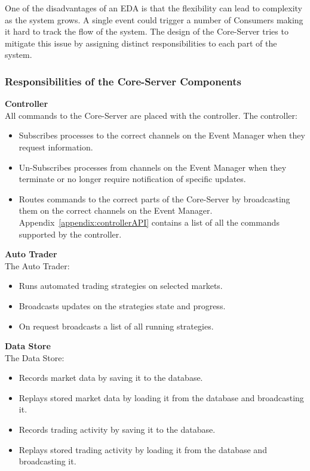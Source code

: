	One of the disadvantages of an EDA is that the flexibility can lead to complexity as the system grows. A single event could trigger a number of Consumers making it hard to track the flow of the system. The design of the Core-Server tries to mitigate this issue by assigning distinct responsibilities to each part of the system.
	
	\subsubsection{Responsibilities of the Core-Server Components}
	
	\textbf{Controller}\\
	All commands to the Core-Server are placed with the controller. The controller:
		\begin{itemize}
			\item Subscribes processes to the correct channels on the Event Manager when they request information.
			\item Un-Subscribes processes from channels on the Event Manager when they terminate or no longer require notification of specific updates.
			\item Routes commands to the correct parts of the Core-Server by broadcasting them on the correct channels on the Event Manager. Appendix~\ref{appendix:controllerAPI} contains a list of all the commands supported by the controller.
		\end{itemize}
	
	\textbf{Auto Trader}\\
	The Auto Trader:
		\begin{itemize}
			\item Runs automated trading strategies on selected markets.
			\item Broadcasts updates on the strategies state and progress.
			\item On request broadcasts a list of all running strategies.
		\end{itemize}
		
	\textbf{Data Store}\\
	The Data Store:
		\begin{itemize}
			\item Records market data by saving it to the database.
			\item Replays stored market data by loading it from the database and broadcasting it.
			\item Records trading activity by saving it to the database.
			\item Replays stored trading activity by loading it from the database and broadcasting it.
		\end{itemize}			
			
